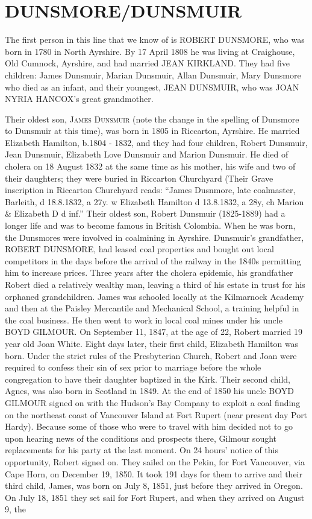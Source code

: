 \section{DUNSMORE/DUNSMUIR}

The first person in this line that we know of is \uppercase{Robert Dunsmore}, who was born in 1780 in North Ayrshire.  By	
17 April 1808 he was living at Craighouse, Old Cumnock, Ayrshire, and had married \uppercase{Jean Kirkland}.  They had five children: James Dunsmuir, Marian Dunsmuir, Allan Dunsmuir, Mary Dunsmore who died as an infant, and  their youngest, \uppercase{Jean Dunsmuir}, who was  \uppercase{Joan Nyria Hancox}'s great grandmother.

Their oldest son, \textsc{James Dunsmuir} (note the change in the spelling of Dunsmore to Dunsmuir at this time), was born in	1805 in Riccarton, Ayrshire. He married Elizabeth Hamilton, b.1804 - 1832, and they had four children, Robert Dunsmuir, Jean Dunsmuir, Elizabeth Love Dunsmuir and Marion Dunsmuir. He died of cholera on 18 August 1832 at the same time as his mother, his wife and two of their daughters; they were buried in Riccarton Churchyard (Their Grave inscription in Riccarton Churchyard reads: ``James Dusnmore, late coalmaster, Barleith, d 18.8.1832, a 27y. w Elizabeth Hamilton d 13.8.1832, a 28y, ch Marion \& Elizabeth D d inf.'' Their oldest son, Robert Dunsmuir (1825-1889) had a longer life and was to become famous in British Colombia.  When he was born, the Dunsmores were involved in coalmining in Ayrshire. Dunsmuir's grandfather, \uppercase{Robert Dunsmore}, had leased coal properties and bought out local competitors in the days before the arrival of the railway in the 1840s permitting him to increase prices.  Three years after the cholera epidemic, his grandfather Robert died a relatively wealthy man, leaving a third of his estate in trust for his orphaned grandchildren. James was schooled locally at the Kilmarnock Academy and then at the Paisley Mercantile and Mechanical School, a training helpful in the coal business. He then went to work in local coal mines under his uncle \uppercase{Boyd Gilmour}.  On September 11, 1847, at the age of 22, Robert married 19 year old Joan White. Eight days later, their first child, Elizabeth Hamilton was born. Under the strict rules of the Presbyterian Church, Robert and Joan were required to confess their sin of sex prior to marriage before the whole congregation to have their daughter baptized in the Kirk. Their second child, Agnes, was also born in Scotland in 1849. At the end of 1850 his uncle \uppercase{Boyd Gilmour} signed on with the Hudson's Bay Company to exploit a coal finding on the northeast coast of Vancouver Island at Fort Rupert (near present day Port Hardy). Because some of those who were to travel with him decided not to go upon hearing news of the conditions and prospects there, Gilmour sought replacements for his party at the last moment. On 24 hours' notice of this opportunity, Robert signed on. They sailed on the Pekin, for Fort Vancouver, via Cape Horn, on December 19, 1850. It took 191 days for them to arrive and their third child, James, was born on July 8, 1851, just before they arrived in Oregon. On July 18, 1851 they set sail for Fort Rupert, and when they arrived on August 9, the 